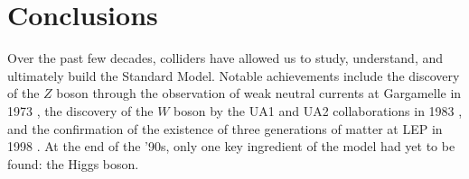 \documentclass[10pt,a4paper]{book}
\begin{document}
\section{Conclusions}
Over the past few decades, colliders have allowed us to study, understand, and ultimately build the Standard Model. Notable achievements include  the discovery of the $Z$ boson through the observation of weak neutral currents at Gargamelle in 1973 \cite{GargamelleNeutrino:1973jyy, HASERT1973121}, the discovery of the $W$ boson by the UA1 and UA2 collaborations in 1983 \cite{UA1:1983crd, UA2:1983tsx}, and the confirmation of the existence of three generations of matter at LEP in 1998 \cite{L3:1998uub}. At the end of the '90s, only one key ingredient of the model had yet to be found: the Higgs boson.

\nocite{Mangano:2018sfp}
\end{document}
